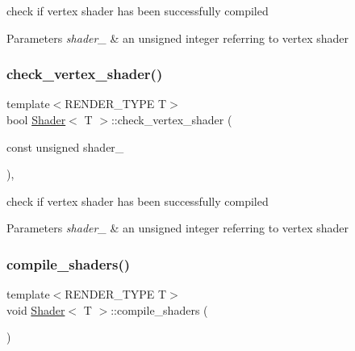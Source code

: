 check if vertex shader has been successfully compiled 


\begin{DoxyParams}{Parameters}
{\em shader\+\_\+} & an unsigned integer referring to vertex shader \\
\hline
\end{DoxyParams}
\mbox{\label{classShader_a6be59304dbddc46ae641e6fe6cd02938}} 
\subsubsection{\texorpdfstring{check\+\_\+vertex\+\_\+shader()}{check\_vertex\_shader()}\hspace{0.1cm}{\footnotesize\ttfamily [2/2]}}
{\footnotesize\ttfamily template$<$R\+E\+N\+D\+E\+R\+\_\+\+T\+Y\+PE T$>$ \\
bool \mbox{\hyperlink{classShader}{Shader}}$<$ T $>$\+::check\+\_\+vertex\+\_\+shader (\begin{DoxyParamCaption}\item[{const unsigned}]{shader\+\_\+ }\end{DoxyParamCaption})\hspace{0.3cm}{\ttfamily [inline]}, {\ttfamily [protected]}}



check if vertex shader has been successfully compiled 


\begin{DoxyParams}{Parameters}
{\em shader\+\_\+} & an unsigned integer referring to vertex shader \\
\hline
\end{DoxyParams}
\mbox{\label{classShader_a1176d69a08aef6df3b7850104871a839}} 
\subsubsection{\texorpdfstring{compile\+\_\+shaders()}{compile\_shaders()}\hspace{0.1cm}{\footnotesize\ttfamily [1/6]}}
{\footnotesize\ttfamily template$<$R\+E\+N\+D\+E\+R\+\_\+\+T\+Y\+PE T$>$ \\
void \mbox{\hyperlink{classShader}{Shader}}$<$ T $>$\+::compile\+\_\+shaders (\begin{DoxyParamCaption}{ }\end{DoxyParamCaption})\hspace{0.3cm}{\ttfamily [protected]}}

